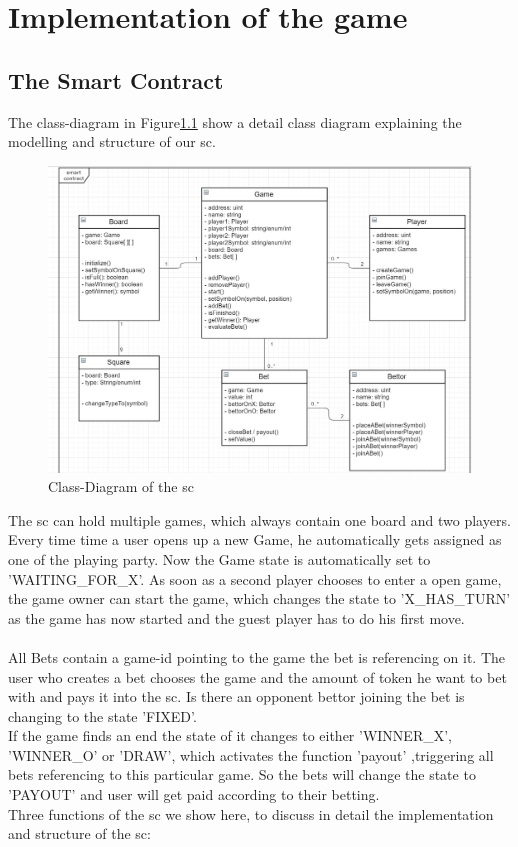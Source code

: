 \chapter{Implementation of the game}\label{ch:implementation}
\section{The Smart Contract}
\noindent The class-diagram in Figure\ref{fig:sc_uml}  show a detail class diagram explaining the modelling and structure of our \ac{sc}. \\
\begin{figure}[ht]
	\begin{center}
		\includegraphics[scale=0.22]{res/sc_uml}
	\end{center}
	\caption{Class-Diagram of the \ac{sc}}
	\label{fig:sc_uml}
\end{figure}\newline
\noindent The \ac{sc} can hold multiple games, which always contain one board and two players. Every time time a user opens up a new Game, he automatically gets assigned as one of the playing party. Now the Game state is automatically set to 'WAITING\_FOR\_X'. As soon as a second player chooses to enter a open game, the game owner can start the game, which changes the state to 'X\_HAS\_TURN' as the game has now started and the guest player has to do his first move.\\\\
All Bets contain a game-id pointing to the game the bet is referencing on it. The user who creates a bet chooses the game and the amount of token he want to bet with and pays it into the \ac{sc}. Is there an opponent bettor joining the bet is changing to the state 'FIXED'.\\
If the game finds an end the state of it changes to either 'WINNER\_X', 'WINNER\_O' or 'DRAW', which activates the function 'payout' ,triggering all bets referencing to this particular game. So the bets will change the state to 'PAYOUT' and user will get paid according to their betting.\\ 
Three functions of the \ac{sc} we show here, to discuss in detail the implementation and structure of the \ac{sc}:\\






